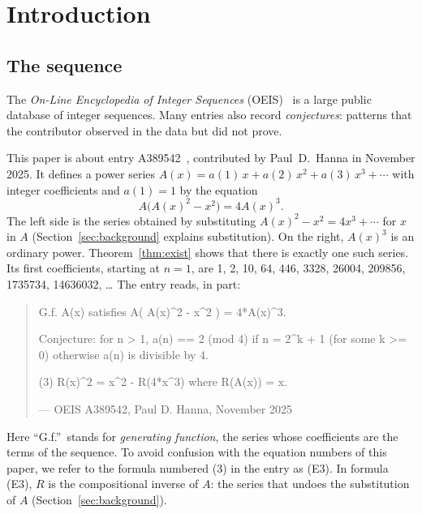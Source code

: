 \documentclass[11pt,a4paper]{article}
\theoremstyle{definition}
\theoremstyle{remark}
\begin{document}
\section{Introduction}

\subsection{The sequence}\label{sec:sequence}
The \emph{On-Line Encyclopedia of Integer Sequences} (OEIS)~\cite{oeisdb} is a large public database of integer
sequences. Many
entries also record \emph{conjectures}: patterns that the contributor observed in the data but did not prove.

This paper is about entry A389542~\cite{oeis}, contributed by Paul~D.~Hanna in November 2025. It defines a power
series $A(x)=a(1)\,x+a(2)\,x^2+a(3)\,x^3+\cdots$ with integer coefficients and $a(1)=1$ by the equation
\begin{equation}\label{eq:oeis}
A\bigl(A(x)^2-x^2\bigr)=4A(x)^3 .
\end{equation}
The left side is the series obtained by substituting $A(x)^2-x^2=4x^3+\cdots$ for $x$ in $A$
(Section~\ref{sec:background} explains substitution). On the right, $A(x)^3$ is an ordinary power. Theorem~\ref{thm:exist} shows that there is exactly one such
series. Its first coefficients, starting at $n=1$, are 1, 2, 10, 64, 446, 3328, 26004, 209856, 1735734, 14636032, \dots{} The entry reads,
in part:
\begin{quote}\small\ttfamily\raggedright G.f. A(x) satisfies A( A(x)\^{}2 - x\^{}2 ) = 4*A(x)\^{}3.\par\smallskip Conjecture: for n > 1, a(n) == 2 (mod 4) if n = 2\^{}k + 1 (for some k >= 0) otherwise a(n) is divisible by 4.\par\smallskip (3) R(x)\^{}2 = x\^{}2 - R(4*x\^{}3) where R(A(x)) = x.\par\smallskip\hfill\textrm{--- OEIS A389542, Paul D. Hanna, November 2025}\end{quote}

Here ``G.f.''\ stands for \emph{generating function}, the series whose coefficients are the terms of the sequence. To
avoid confusion with the equation numbers of this paper, we refer to the formula numbered (3) in the entry as (E3). In
formula (E3), $R$ is the compositional inverse of $A$: the series that undoes the substitution of $A$
(Section~\ref{sec:background}).
\end{document}
